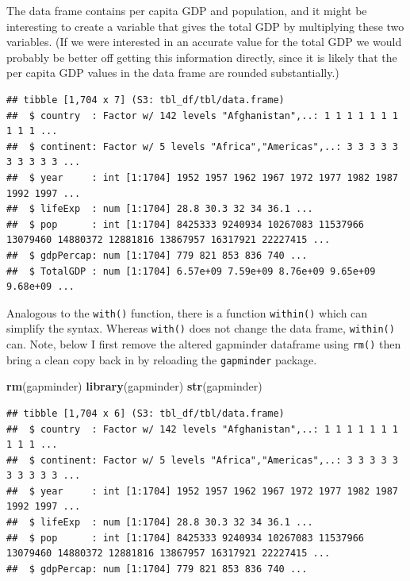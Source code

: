\documentclass[
]{krantz}
\newenvironment{Shaded}{\begin{snugshade}}{\end{snugshade}}
\newcommand{\KeywordTok}[1]{\textcolor[rgb]{0.13,0.29,0.53}{\textbf{#1}}}
\newcommand{\NormalTok}[1]{#1}
\newcommand{\OperatorTok}[1]{\textcolor[rgb]{0.81,0.36,0.00}{\textbf{#1}}}
\newcommand{\StringTok}[1]{\textcolor[rgb]{0.31,0.60,0.02}{#1}}
\begin{document}
The data frame contains per capita GDP and population, and it might be interesting to create a variable that gives the total GDP by multiplying these two variables. (If we were interested in an accurate value for the total GDP we would probably be better off getting this information directly, since it is likely that the per capita GDP values in the data frame are rounded substantially.)

\begin{Shaded}
\end{Shaded}

\begin{verbatim}
## tibble [1,704 x 7] (S3: tbl_df/tbl/data.frame)
##  $ country  : Factor w/ 142 levels "Afghanistan",..: 1 1 1 1 1 1 1 1 1 1 ...
##  $ continent: Factor w/ 5 levels "Africa","Americas",..: 3 3 3 3 3 3 3 3 3 3 ...
##  $ year     : int [1:1704] 1952 1957 1962 1967 1972 1977 1982 1987 1992 1997 ...
##  $ lifeExp  : num [1:1704] 28.8 30.3 32 34 36.1 ...
##  $ pop      : int [1:1704] 8425333 9240934 10267083 11537966 13079460 14880372 12881816 13867957 16317921 22227415 ...
##  $ gdpPercap: num [1:1704] 779 821 853 836 740 ...
##  $ TotalGDP : num [1:1704] 6.57e+09 7.59e+09 8.76e+09 9.65e+09 9.68e+09 ...
\end{verbatim}

Analogous to the \texttt{with()} function, there is a function \texttt{within()} which can simplify the syntax. Whereas \texttt{with()} does not change the data frame, \texttt{within()} can. Note, below I first remove the altered gapminder dataframe using \texttt{rm()} then bring a clean copy back in by reloading the \texttt{gapminder} package.

\begin{Shaded}
\begin{Highlighting}[]
\KeywordTok{rm}\NormalTok{(gapminder)}
\KeywordTok{library}\NormalTok{(gapminder)}
\KeywordTok{str}\NormalTok{(gapminder)}
\end{Highlighting}
\end{Shaded}

\begin{verbatim}
## tibble [1,704 x 6] (S3: tbl_df/tbl/data.frame)
##  $ country  : Factor w/ 142 levels "Afghanistan",..: 1 1 1 1 1 1 1 1 1 1 ...
##  $ continent: Factor w/ 5 levels "Africa","Americas",..: 3 3 3 3 3 3 3 3 3 3 ...
##  $ year     : int [1:1704] 1952 1957 1962 1967 1972 1977 1982 1987 1992 1997 ...
##  $ lifeExp  : num [1:1704] 28.8 30.3 32 34 36.1 ...
##  $ pop      : int [1:1704] 8425333 9240934 10267083 11537966 13079460 14880372 12881816 13867957 16317921 22227415 ...
##  $ gdpPercap: num [1:1704] 779 821 853 836 740 ...
\end{verbatim}
\end{document}
